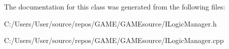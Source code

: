 The documentation for this class was generated from the following files\+:\begin{DoxyCompactItemize}
\item 
C\+:/\+Users/\+User/source/repos/\+G\+A\+M\+E/\+G\+A\+M\+Esource/I\+Logic\+Manager.\+h\item 
C\+:/\+Users/\+User/source/repos/\+G\+A\+M\+E/\+G\+A\+M\+Esource/I\+Logic\+Manager.\+cpp\end{DoxyCompactItemize}
